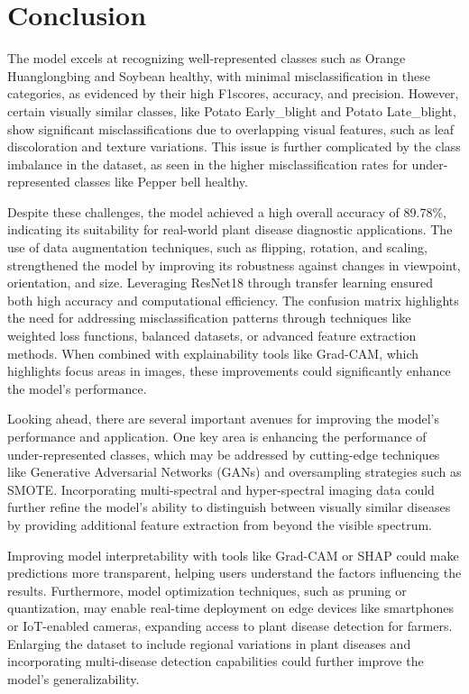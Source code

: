 \documentclass[conference]{IEEEtran}
\begin{document}
\vspace{1cm}


\section{\textbf{Conclusion}}

The model excels at recognizing well-represented classes such as Orange Huanglongbing and Soybean healthy, with minimal misclassification in these categories, as evidenced by their high F1\-scores, accuracy, and precision. However, certain visually similar classes, like Potato Early\_blight and Potato Late\_blight, show significant misclassifications due to overlapping visual features, such as leaf discoloration and texture variations. This issue is further complicated by the class imbalance in the dataset, as seen in the higher misclassification rates for under-represented classes like Pepper bell healthy.

Despite these challenges, the model achieved a high overall accuracy of 89.78\%, indicating its suitability for real-world plant disease diagnostic applications. The use of data augmentation techniques, such as flipping, rotation, and scaling, strengthened the model by improving its robustness against changes in viewpoint, orientation, and size. Leveraging ResNet18 through transfer learning ensured both high accuracy and computational efficiency. The confusion matrix highlights the need for addressing misclassification patterns through techniques like weighted loss functions, balanced datasets, or advanced feature extraction methods. When combined with explainability tools like Grad-CAM, which highlights focus areas in images, these improvements could significantly enhance the model's performance.

Looking ahead, there are several important avenues for improving the model's performance and application. One key area is enhancing the performance of under-represented classes, which may be addressed by cutting-edge techniques like Generative Adversarial Networks (GANs) and oversampling strategies such as SMOTE. Incorporating multi-spectral and hyper-spectral imaging data could further refine the model's ability to distinguish between visually similar diseases by providing additional feature extraction from beyond the visible spectrum.

Improving model interpretability with tools like Grad-CAM or SHAP could make predictions more transparent, helping users understand the factors influencing the results. Furthermore, model optimization techniques, such as pruning or quantization, may enable real-time deployment on edge devices like smartphones or IoT-enabled cameras, expanding access to plant disease detection for farmers. Enlarging the dataset to include regional variations in plant diseases and incorporating multi-disease detection capabilities could further improve the model's generalizability.
\end{document}
